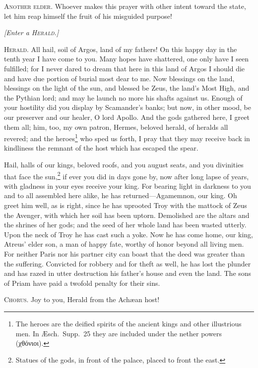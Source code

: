 \documentclass[12pt]{article}
\begin{document}
\textsc{Another elder.} Whoever makes this prayer with other intent toward the state, let him reap himself the fruit of his misguided purpose!

\begin{center}
\textit{[Enter a \textsc{Herald.}]}
\end{center}

\textsc{Herald.} All hail, soil of Argos, land of my fathers! On this happy day in the tenth year I have come to you. Many hopes have shattered, one only have I seen fulfilled; for I never dared to dream that here in this land of Argos I should die and have due portion of burial most dear to me. Now blessings on the land, blessings on the light of the sun, and blessed be Zeus, the land's Most High, and the Pythian lord; and may he launch no more his shafts against us. Enough of your hostility did you display by Scamander's banks; but now, in other mood, be our preserver and our healer, O lord Apollo. And the gods gathered here, I greet them all; him, too, my own patron, Hermes, beloved herald, of heralds all revered; and the heroes\footnote{The heroes are the deified spirits of the ancient kings and other illustrious men. In {\AE}sch.~Supp.~25 they are included under the nether powers (χθόνιοι).} who sped us forth, I pray that they may receive back in kindliness the remnant of the host which has escaped the spear.

Hail, halls of our kings, beloved roofs, and you august seats, and you divinities that face the sun,\footnote{Statues of the gods, in front of the palace, placed to front the east.} if ever you did in days gone by, now after long lapse of years, with gladness in your eyes receive your king. For bearing light in darkness to you and to all assembled here alike, he has returned---Agamemnon, our king. Oh greet him well, as is right, since he has uprooted Troy with the mattock of Zeus the Avenger, with which her soil has been uptorn. Demolished are the altars and the shrines of her gods; and the seed of her whole land has been wasted utterly. Upon the neck of Troy he has cast such a yoke. Now he has come home, our king, Atreus' elder son, a man of happy fate, worthy of honor beyond all living men. For neither Paris nor his partner city can boast that the deed was greater than the suffering. Convicted for robbery and for theft as well, he has lost the plunder and has razed in utter destruction his father's house and even the land. The sons of Priam have paid a twofold penalty for their sins.

\textsc{Chorus.} Joy to you, Herald from the Ach{\ae}an host!
\end{document}
